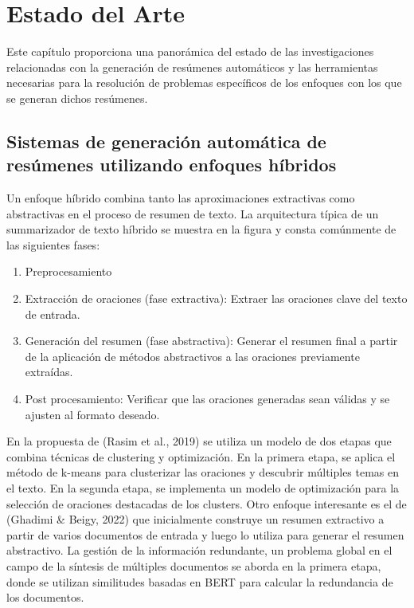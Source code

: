 \chapter{Estado del Arte}\label{chapter:state-of-the-art}
    Este capítulo proporciona una panorámica del estado de las investigaciones relacionadas con la generación de resúmenes automáticos y las herramientas necesarias para la resolución de problemas específicos de los enfoques con los que se generan dichos resúmenes.

\section{Sistemas de generación automática de resúmenes utilizando enfoques híbridos}

Un enfoque híbrido combina tanto las aproximaciones extractivas como abstractivas en el proceso de resumen de texto. La arquitectura típica de un summarizador de texto híbrido se muestra en la figura {} y consta comúnmente de las siguientes fases:



\begin{enumerate}
    \item Preprocesamiento
    \item Extracción de oraciones (fase extractiva): Extraer las oraciones clave del texto de entrada.\cite[(Wang et al., 2017)]{Wang}
    \item Generación del resumen (fase abstractiva): Generar el resumen final a partir de la aplicación de métodos abstractivos a las oraciones previamente extraídas.
    \item Post procesamiento: Verificar que las oraciones generadas sean válidas y se ajusten al formato deseado.
\end{enumerate}


En la propuesta de (Rasim et al., 2019)\cite{cosum} se utiliza un modelo de dos etapas que combina técnicas de clustering y optimización. En la primera etapa, se aplica el método de k-means para clusterizar las oraciones y descubrir múltiples temas en el texto. En la segunda etapa, se implementa un modelo de optimización para la selección de oraciones destacadas de los clusters. Otro enfoque interesante es el de (Ghadimi \& Beigy, 2022)\cite{hybrid-llm} que inicialmente construye un resumen extractivo a partir de varios documentos de entrada y luego lo utiliza para generar el resumen abstractivo. La gestión de la información redundante, un problema global en el campo de la síntesis de múltiples documentos se aborda en la primera etapa, donde se utilizan similitudes basadas en BERT\cite{BERT} para calcular la redundancia de los documentos.


